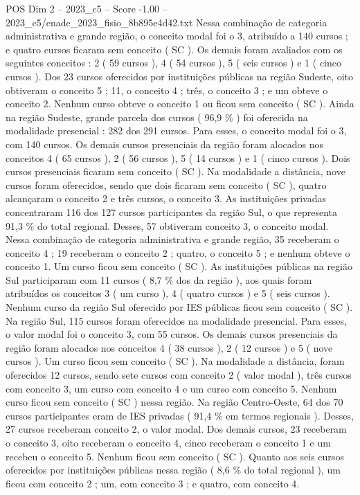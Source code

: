 \begin{textsample}{POS Dim 2 – 2023\_c5 – Score -1.00 – 2023\_c5/enade\_2023\_fisio\_8b895e4d42.txt}
Nessa combinação de categoria administrativa e grande região, o conceito modal foi o 3, atribuído a 140 cursos ; e quatro cursos ficaram sem conceito ( SC ).
Os demais foram avaliados com os seguintes conceitos : 2 ( 59 cursos ), 4 ( 54 cursos ), 5 ( seis cursos ) e 1 ( cinco cursos ).
Dos 23 cursos oferecidos por instituições públicas na região Sudeste, oito obtiveram o conceito 5 ; 11, o conceito 4 ; três, o conceito 3 ; e um obteve o conceito 2.
Nenhum curso obteve o conceito 1 ou ficou sem conceito ( SC ).
Ainda na região Sudeste, grande parcela dos cursos ( 96,9 \% ) foi oferecida na modalidade presencial : 282 dos 291 cursos.
Para esses, o conceito modal foi o 3, com 140 cursos.
Os demais cursos presenciais da região foram alocados nos conceitos 4 ( 65 cursos ), 2 ( 56 cursos ), 5 ( 14 cursos ) e 1 ( cinco cursos ).
Dois cursos presenciais ficaram sem conceito ( SC ).
Na modalidade a distância, nove cursos foram oferecidos, sendo que dois ficaram sem conceito ( SC ), quatro alcançaram o conceito 2 e três cursos, o conceito 3.
As instituições privadas concentraram 116 dos 127 cursos participantes da região Sul, o que representa 91,3 \% do total regional.
Desses, 57 obtiveram conceito 3, o conceito modal.
Nessa combinação de categoria administrativa e grande região, 35 receberam o conceito 4 ; 19 receberam o conceito 2 ; quatro, o conceito 5 ; e nenhum obteve o conceito 1.
Um curso ficou sem conceito ( SC ).
As instituições públicas na região Sul participaram com 11 cursos ( 8,7 \% dos da região ), aos quais foram atribuídos os conceitos 3 ( um curso ), 4 ( quatro cursos ) e 5 ( seis cursos ).
Nenhum curso da região Sul oferecido por IES públicas ficou sem conceito ( SC ).
Na região Sul, 115 cursos foram oferecidos na modalidade presencial.
Para esses, o valor modal foi o conceito 3, com 55 cursos.
Os demais cursos presenciais da região foram alocados nos conceitos 4 ( 38 cursos ), 2 ( 12 cursos ) e 5 ( nove cursos ).
Um curso ficou sem conceito ( SC ).
Na modalidade a distância, foram oferecidos 12 cursos, sendo sete cursos com conceito 2 ( valor modal ), três cursos com conceito 3, um curso com conceito 4 e um curso com conceito 5.
Nenhum curso ficou sem conceito ( SC ) nessa região.
Na região Centro-Oeste, 64 dos 70 cursos participantes eram de IES privadas ( 91,4 \% em termos regionais ).
Desses, 27 cursos receberam conceito 2, o valor modal.
Dos demais cursos, 23 receberam o conceito 3, oito receberam o conceito 4, cinco receberam o conceito 1 e um recebeu o conceito 5.
Nenhum ficou sem conceito ( SC ).
Quanto aos seis cursos oferecidos por instituições públicas nessa região ( 8,6 \% do total regional ), um ficou com conceito 2 ; um, com conceito 3 ; e quatro, com conceito 4.

\end{textsample}
